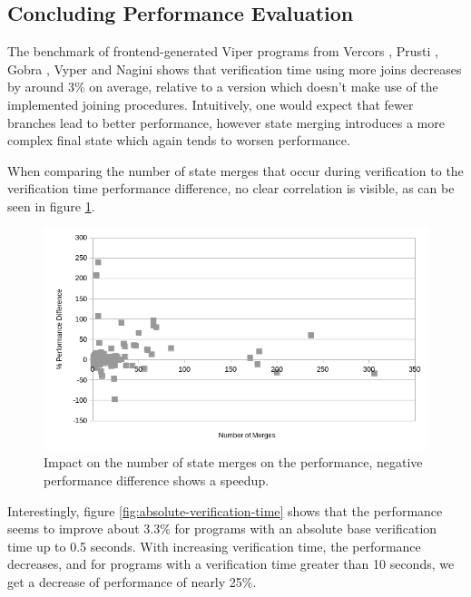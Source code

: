 \documentclass[11pt]{article}
\begin{document}
    \subsection{Concluding Performance Evaluation} \label{concluding-performance-evaluation}
    
    The benchmark of frontend-generated Viper programs from Vercors \cite{vercors},
    Prusti \cite{prusti}, Gobra \cite{gobra}, Vyper \cite{vyper} and Nagini \cite{nagini}
    shows that verification time using more joins
    decreases by around 3\% on average, relative to a version which doesn't
    make use of the implemented joining procedures.
    Intuitively, one would expect that fewer branches lead to better
    performance, however state merging introduces a more complex final state which again tends to worsen
    performance.
    
    When comparing the number of state merges that occur during verification
    to the verification time performance difference, no clear correlation is
    visible, as can be seen in figure \ref{fig:state-merges}.

    \begin{figure}[H]
        \includegraphics[width=\linewidth]{state-merges-vs-performance.png}
        \caption{
            Impact on the number of state merges on the performance,
            negative performance difference shows a speedup.
        }
        \label{fig:state-merges}
    \end{figure}

    Interestingly, figure \ref{fig:absolute-verification-time} shows that the performance seems to improve about 3.3\% for programs
    with an absolute base verification time up to 0.5 seconds. With increasing verification
    time, the performance decreases, and for programs with a verification time greater
    than 10 seconds, we get a decrease of performance of nearly 25\%.
    
\end{document}
